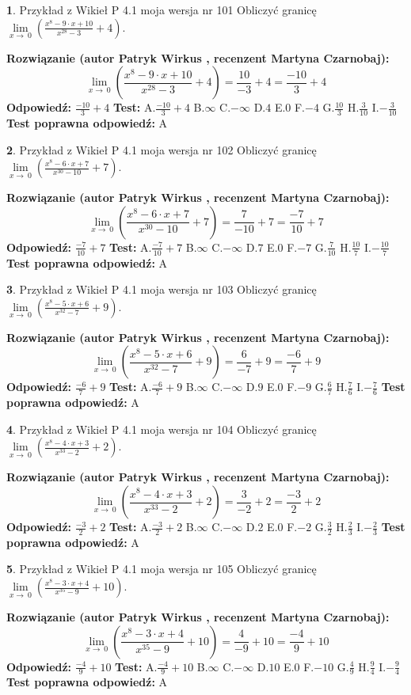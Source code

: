 \documentclass[12pt, a4paper]{article}
\theoremstyle{definition} %
\newtheorem{zad}{}
\newcommand{\zadStart}[1]{\begin{zad}#1\newline}
\newcommand{\zadStop}{\end{zad}}
\newcommand{\rozwStart}[2]{\noindent \textbf{Rozwiązanie (autor #1 , recenzent #2): }\newline}
\newcommand{\rozwStop}{\newline}
\newcommand{\odpStart}{\noindent \textbf{Odpowiedź:}\newline}
\newcommand{\odpStop}{\newline}
\newcommand{\testStart}{\noindent \textbf{Test:}\newline}
\newcommand{\testStop}{\newline}
\newcommand{\kluczStart}{\noindent \textbf{Test poprawna odpowiedź:}\newline}
\newcommand{\kluczStop}{\newline}
\begin{document}
\zadStart{Przykład z Wikieł P 4.1 moja wersja nr 101}
Obliczyć granicę $\lim\limits_{x\to\ 0}(\frac{x^{8}-9 \cdot x +10}{x^{28}-3}+4)$.
\zadStop
\rozwStart{Patryk Wirkus}{Martyna Czarnobaj}
$$\lim\limits_{x\to\ 0}(\frac{x^{8}-9 \cdot x +10}{x^{28}-3}+4)=\frac{10}{-3}+4=\frac{-10}{3}+4$$
\rozwStop
\odpStart
$\frac{-10}{3}+4$
\odpStop
\testStart
A.$\frac{-10}{3}+4$
B.$\infty$
C.$-\infty$
D.$4$
E.$0$
F.$-4$
G.$\frac{10}{3}$
H.$\frac{3}{10}$
I.$-\frac{3}{10}$
\testStop
\kluczStart
A
\kluczStop



\zadStart{Przykład z Wikieł P 4.1 moja wersja nr 102}
Obliczyć granicę $\lim\limits_{x\to\ 0}(\frac{x^{8}-6 \cdot x +7}{x^{30}-10}+7)$.
\zadStop
\rozwStart{Patryk Wirkus}{Martyna Czarnobaj}
$$\lim\limits_{x\to\ 0}(\frac{x^{8}-6 \cdot x +7}{x^{30}-10}+7)=\frac{7}{-10}+7=\frac{-7}{10}+7$$
\rozwStop
\odpStart
$\frac{-7}{10}+7$
\odpStop
\testStart
A.$\frac{-7}{10}+7$
B.$\infty$
C.$-\infty$
D.$7$
E.$0$
F.$-7$
G.$\frac{7}{10}$
H.$\frac{10}{7}$
I.$-\frac{10}{7}$
\testStop
\kluczStart
A
\kluczStop



\zadStart{Przykład z Wikieł P 4.1 moja wersja nr 103}
Obliczyć granicę $\lim\limits_{x\to\ 0}(\frac{x^{8}-5 \cdot x +6}{x^{32}-7}+9)$.
\zadStop
\rozwStart{Patryk Wirkus}{Martyna Czarnobaj}
$$\lim\limits_{x\to\ 0}(\frac{x^{8}-5 \cdot x +6}{x^{32}-7}+9)=\frac{6}{-7}+9=\frac{-6}{7}+9$$
\rozwStop
\odpStart
$\frac{-6}{7}+9$
\odpStop
\testStart
A.$\frac{-6}{7}+9$
B.$\infty$
C.$-\infty$
D.$9$
E.$0$
F.$-9$
G.$\frac{6}{7}$
H.$\frac{7}{6}$
I.$-\frac{7}{6}$
\testStop
\kluczStart
A
\kluczStop



\zadStart{Przykład z Wikieł P 4.1 moja wersja nr 104}
Obliczyć granicę $\lim\limits_{x\to\ 0}(\frac{x^{8}-4 \cdot x +3}{x^{33}-2}+2)$.
\zadStop
\rozwStart{Patryk Wirkus}{Martyna Czarnobaj}
$$\lim\limits_{x\to\ 0}(\frac{x^{8}-4 \cdot x +3}{x^{33}-2}+2)=\frac{3}{-2}+2=\frac{-3}{2}+2$$
\rozwStop
\odpStart
$\frac{-3}{2}+2$
\odpStop
\testStart
A.$\frac{-3}{2}+2$
B.$\infty$
C.$-\infty$
D.$2$
E.$0$
F.$-2$
G.$\frac{3}{2}$
H.$\frac{2}{3}$
I.$-\frac{2}{3}$
\testStop
\kluczStart
A
\kluczStop



\zadStart{Przykład z Wikieł P 4.1 moja wersja nr 105}
Obliczyć granicę $\lim\limits_{x\to\ 0}(\frac{x^{8}-3 \cdot x +4}{x^{35}-9}+10)$.
\zadStop
\rozwStart{Patryk Wirkus}{Martyna Czarnobaj}
$$\lim\limits_{x\to\ 0}(\frac{x^{8}-3 \cdot x +4}{x^{35}-9}+10)=\frac{4}{-9}+10=\frac{-4}{9}+10$$
\rozwStop
\odpStart
$\frac{-4}{9}+10$
\odpStop
\testStart
A.$\frac{-4}{9}+10$
B.$\infty$
C.$-\infty$
D.$10$
E.$0$
F.$-10$
G.$\frac{4}{9}$
H.$\frac{9}{4}$
I.$-\frac{9}{4}$
\testStop
\kluczStart
A
\kluczStop
\end{document}
